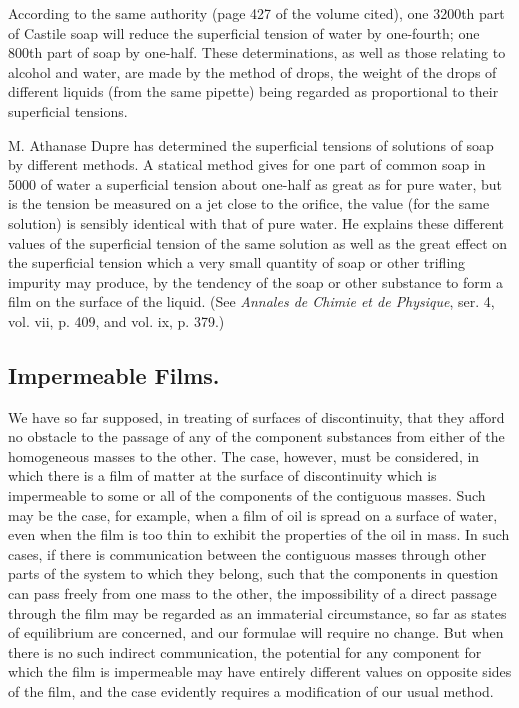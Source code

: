 \documentclass[12pt]{article}
\begin{document}
{According to the same authority (page 427 of the volume cited), one 3200th part of Castile soap will reduce the superficial tension of water by one-fourth; one 800th part of soap by one-half. These determinations, as well as those relating to alcohol and water, are made by the method of drops, the weight of the drops of different liquids (from the same pipette) being regarded as proportional to their superficial tensions.
 \par
M. Athanase Dupre has determined the superficial tensions of solutions of soap by different methods. A statical method gives for one part of common soap in 5000 of water a superficial tension about one-half as great as for pure water, but is the tension be measured on a jet close to the orifice, the value (for the same solution) is sensibly identical with that of pure water. He explains these different values of the superficial tension of the same solution as well as the great effect on the superficial tension which a very small quantity of soap or other trifling impurity may produce, by the tendency of the soap or other substance to form a film on the surface of the liquid. (See \textit{Annales de Chimie et de Physique}, ser. 4, vol. vii, p. 409, and vol. ix, p. 379.)}

\subsection{Impermeable Films.}
We have so far supposed, in treating of surfaces of discontinuity, that they afford no obstacle to the passage of any of the component substances from either of the homogeneous masses to the other. The case, however, must be considered, in which there is a film of matter at the surface of discontinuity which is impermeable to some or all of the components of the contiguous masses. Such may be the case, for example, when a film of oil is spread on a surface of water, even when the film is too thin to exhibit the properties of the oil in mass. In such cases, if there is communication between the contiguous masses through other parts of the system to which they belong, such that the components in question can pass freely from one mass to the other, the impossibility of a direct passage through the film may be regarded as an immaterial circumstance, so far as states of equilibrium are concerned, and our formulae will require no change. But when there is no such indirect communication, the potential for any component for which the film is impermeable may have entirely different values on opposite sides of the film, and the case evidently requires a modification of our usual method.
\end{document}
